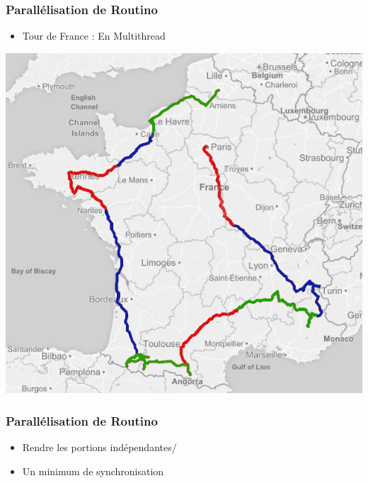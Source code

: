\begin{frame}
  \frametitle{Parallélisation de Routino}
  
  \begin{itemize}
  \item Tour de France : En Multithread
  \end{itemize}

  \begin{center}
    \includegraphics[scale=0.33]{include/tourfrance_multi.png}
  \end{center}
  
\end{frame}


\begin{frame}
  \frametitle{Parallélisation de Routino}

  \begin{itemize}
  \item Rendre les portions indépendantes/
    \vspace{1em}
  \item Un minimum de synchronisation
  \end{itemize}

\end{frame}


